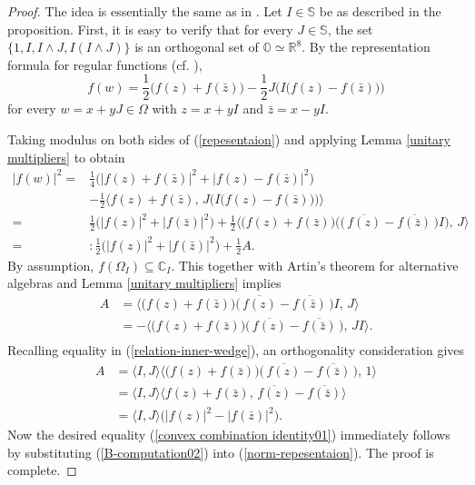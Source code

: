 \documentclass{amsart}
\theoremstyle{definition}
\theoremstyle{remark}
\numberwithin{equation}{section}
\begin{document}
\begin{proof}
The idea is essentially the same as in \cite{RW2}. Let $I\in \mathbb S$ be   as described in  the proposition. First, it is easy to verify that for every $J\in \mathbb S$, the set $\big\{1, I, I\wedge J, I(I\wedge J)\big\}$ is an orthogonal set of $\mathbb O\simeq\mathbb R^8$. By the representation formula for regular functions (cf. \cite[Proposition 6]{Ghiloni1}),
\begin{equation}\label{repesentaion}
f(w)=\frac{1}{2}\big(f(z)+f(\bar z)\big)-\frac{1}{2}J\Big(I\big(f(z)-f(\bar z)\big)\Big)
\end{equation}
for every  $ w=x+yJ \in \Omega$ with $z=x+yI$ and $\bar z=x-yI$.

Taking modulus on both sides of (\ref{repesentaion}) and applying Lemma \ref{unitary multipliers} to obtain
\begin{equation}\label{norm-repesentaion}
\begin{split}
|f(w)|^2
=&\frac14\Big(\big|f(z)+f(\bar z)\big|^2+\big|f(z)-f(\bar z)\big|^2\Big)\\
&-\frac12\Big\langle f(z)+f(\bar z), \, J\Big(I\big(f(z)-f(\bar z)\big)\Big)\Big\rangle\\
=&\frac12\big(|f(z)|^2+|f(\bar z)|^2\big)+
\frac12\Big\langle \big(f(z)+f(\bar z)\big)\Big(\big(\,\overline{f(z)}-\overline{f(\bar z)}\,\big)I\Big), \,J\Big\rangle\\
=&: \frac12\big(|f(z)|^2+|f(\bar z)|^2\big)+\frac{1}{2}A.
\end{split}
\end{equation}
By assumption,  $f(\Omega_I)\subseteq \mathbb C_I $. This together with   Artin's theorem for alternative algebras and Lemma \ref{unitary multipliers} implies
\begin{equation}\label{B-computation01}
\begin{split}
A&=\Big\langle \big(f(z)+f(\bar z)\big)\big(\,\overline{f(z)}-\overline{f(\bar z)}\,\big)I, \,J\Big\rangle\\
&=-\Big\langle \big(f(z)+f(\bar z)\big)\big(\,\overline{f(z)}-\overline{f(\bar z)}\,\big), \,J I\Big\rangle.\\
\end{split}
\end{equation}
Recalling equality in (\ref{relation-inner-wedge}), an orthogonality consideration gives
\begin{equation}\label{B-computation02}
\begin{split}
A&=\langle I, J\rangle\Big\langle \big(f(z)+f(\bar z)\big)\big(\,\overline{f(z)}-\overline{f(\bar z)}\,\big), \,1\Big\rangle\\
&=\langle I, J\rangle\Big\langle f(z)+f(\bar z), \,\overline{f(z)}-\overline{f(\bar z)}\Big\rangle\\
&=\langle I, J\rangle \big(|f(z)|^2-|f(\bar z)|^2\big).
\end{split}
\end{equation}
Now the desired equality (\ref{convex combination identity01}) immediately follows by substituting  (\ref{B-computation02}) into (\ref{norm-repesentaion}). The proof is complete.
 \end{proof}
\end{document}
